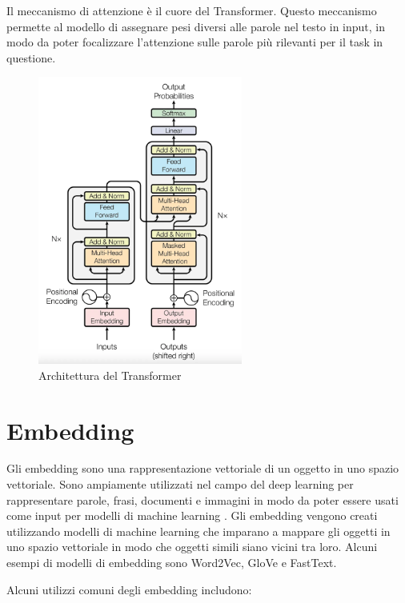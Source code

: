 Il meccanismo di attenzione è il cuore del Transformer.
Questo meccanismo permette al modello di assegnare pesi
diversi alle parole nel testo in input, in modo da poter
focalizzare l'attenzione sulle parole più rilevanti per il
task in questione.

\begin{figure}[H]
  \centering
  \includegraphics[width=0.6\textwidth]{res/transformer.png}
  \caption{Architettura del Transformer}
  \label{fig:transformer-architecture}
\end{figure}

\section{Embedding}
\label{sec:embedding}
Gli embedding sono una rappresentazione vettoriale di un
oggetto in uno spazio vettoriale.
Sono ampiamente utilizzati nel campo del deep learning per
rappresentare parole, frasi, documenti e immagini in modo
da poter essere usati come input per modelli di machine
learning \cite{mikolov2013efficient}.
Gli embedding vengono creati utilizzando modelli di machine
learning che imparano a mappare gli oggetti in uno spazio
vettoriale in modo che oggetti simili siano vicini tra
loro.
Alcuni esempi di modelli di embedding sono Word2Vec, GloVe
e FastText.

Alcuni utilizzi comuni degli embedding includono:

